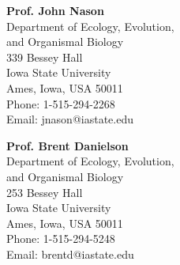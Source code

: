 \documentclass[letterpaper]{article}
\def\footerlink{http://bradduthie.github.io/DuthieCV.pdf}
\renewenvironment{itemize}{
  \begin{list}{}{
    \setlength{\leftmargin}{1.5em}
  }
}{
  \end{list}
}
\begin{document}
\begin{minipage}{0.5\linewidth}

\begin{itemize}

\newline
\item {\bf Prof. John Nason} \\
Department of Ecology, Evolution, \\ and Organismal Biology \\
339 Bessey Hall \\
Iowa State University \\
Ames, Iowa, USA 50011 \\
Phone: 1-515-294-2268 \\
Email: jnason@iastate.edu

\item {\bf Prof. Brent Danielson} \\
Department of Ecology, Evolution, \\ and Organismal Biology \\
253 Bessey Hall \\
Iowa State University \\
Ames, Iowa, USA 50011 \\
Phone: 1-515-294-5248 \\
Email: brentd@iastate.edu
\end{itemize}

\end{minipage}

\bigskip

\end{document}
